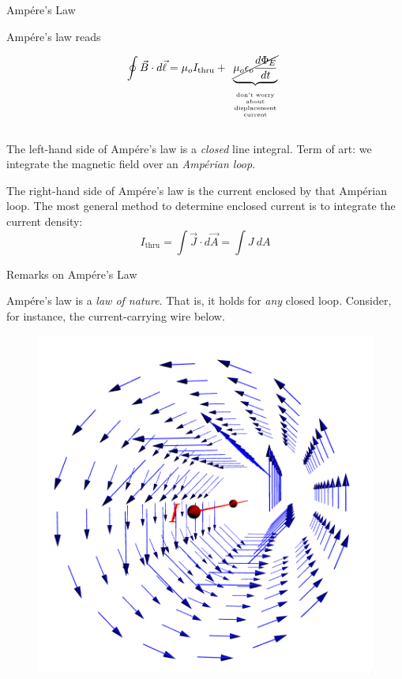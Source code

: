 \documentclass{beamer}
\begin{document}
\begin{frame}{Amp{\'e}re's Law}

Amp{\'e}re's law reads

\begin{equation*}
    \oint \vec{B} \cdot d\vec{\ell} = \mu_o I_{\text{thru}} + \underbrace{\cancel{\mu_o \epsilon_o \frac{d \Phi_E}{dt}}}_{\parbox[b]{5em}{\vspace{-0.5em} \begin{center} \tiny don't worry about displacement current \end{center}}}
\end{equation*}

\vfill

The left-hand side of Amp{\'e}re's law is a \emph{closed} line integral. Term of art: we integrate the magnetic field over an \emph{Amp{\'e}rian loop}.

\vfill

The right-hand side of Amp{\'e}re's law is the current enclosed by that Amp{\'e}rian loop. The most general method to determine enclosed current is to integrate the current density:
\begin{equation*}
    I_{\text{thru}} = \int \vec{J} \cdot d\vec{A} = \int J\ dA
\end{equation*}

\end{frame}

\begin{frame}{Remarks on Amp{\'e}re's Law}

Amp{\'e}re's law is a \emph{law of nature}. That is, it holds for \emph{any} closed loop. Consider, for instance, the current-carrying wire below.

\begin{figure}[H]
\centering
\includegraphics[height=0.6\textheight]{figures/infwire.png}
\end{figure}

\end{frame}
\end{document}
